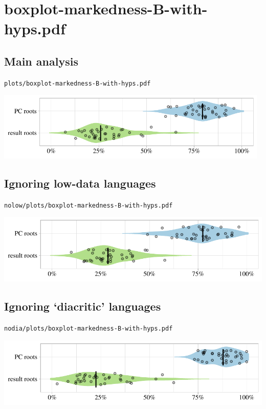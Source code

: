 \eject

\section{boxplot-markedness-B-with-hyps.pdf}

\subsection{Main analysis}

\texttt{plots/boxplot-markedness-B-with-hyps.pdf}

\includegraphics[width=0.98\textwidth]{../plots/boxplot-markedness-B-with-hyps.pdf}

\subsection{Ignoring low-data languages}

\texttt{nolow/plots/boxplot-markedness-B-with-hyps.pdf}

\includegraphics[width=1.0\textwidth]{../nolow/plots/boxplot-markedness-B-with-hyps.pdf}

\subsection{Ignoring `diacritic' languages}

\texttt{nodia/plots/boxplot-markedness-B-with-hyps.pdf}

\includegraphics[width=1.0\textwidth]{../nodia/plots/boxplot-markedness-B-with-hyps.pdf}

